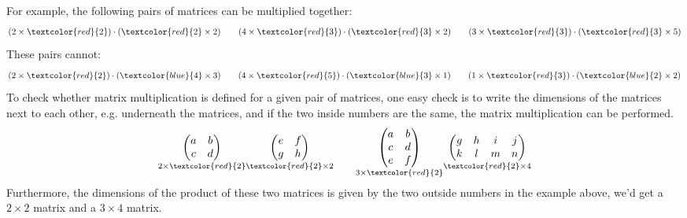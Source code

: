 \documentclass[letterpaper,10pt,english]{jupyterBook}
\begin{document}
\sphinxAtStartPar
For example, the following pairs of matrices can be multiplied together:
\begin{equation*}
\begin{split} (2 \times \textcolor{red}{2}) \cdot (\textcolor{red}{2} \times 2) \qquad (4 \times \textcolor{red}{3}) \cdot (\textcolor{red}{3} \times 2) \qquad (3 \times \textcolor{red}{3}) \cdot (\textcolor{red}{3} \times 5) \end{split}
\end{equation*}
\sphinxAtStartPar
These pairs cannot:
\begin{equation*}
\begin{split} (2 \times \textcolor{red}{2}) \cdot (\textcolor{blue}{4} \times 3) \qquad (4 \times \textcolor{red}{5}) \cdot (\textcolor{blue}{3} \times 1) \qquad (1 \times \textcolor{red}{3}) \cdot (\textcolor{blue}{2} \times 2) \end{split}
\end{equation*}
\sphinxAtStartPar
To check whether matrix multiplication is defined for a given pair of matrices, one easy check is to write the dimensions of the matrices next to each other, e.g. underneath the matrices, and if the two inside numbers are the same, the matrix multiplication can be performed.
\begin{equation*}
\begin{split} \begin{align*}
    \underset{2 \times \textcolor{red}{2}}{\begin{pmatrix} a & b \\ c & d \end{pmatrix}}
    \underset{\textcolor{red}{2} \times 2}{\begin{pmatrix} e & f \\ g & h \end{pmatrix}}
\qquad
    \underset{3 \times \textcolor{red}{2}}{\begin{pmatrix} a & b \\ c & d \\ e & f \end{pmatrix}}
    \underset{\textcolor{red}{2} \times 4}{\begin{pmatrix} g & h & i & j \\  k & l & m & n \end{pmatrix}}
\end{align*} \end{split}
\end{equation*}
\sphinxAtStartPar
Furthermore, the dimensions of the product of these two matrices is given by the two outside numbers \sphinxhyphen{} in the example above, we’d get a \(2 \times 2\) matrix and a \(3 \times 4\) matrix.
\end{document}
